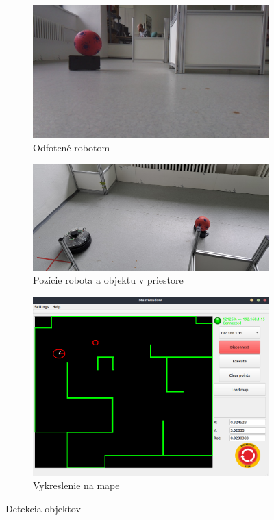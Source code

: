 \begin{figure}[!htbp]
	\centering

	\begin{subfigure}{0.49\textwidth}
		\includegraphics[width=\textwidth]{img/circles.jpg}
            \caption{ Odfotené robotom }
	\end{subfigure}
	\hfill
	\begin{subfigure}{0.49\textwidth}
		\includegraphics[width=\textwidth]{img/real.jpg}
            \caption{ Pozície robota a objektu v priestore }
	\end{subfigure}

	\vspace{\baselineskip}

	\begin{subfigure}{0.49\textwidth}
		\includegraphics[width=\textwidth]{img/mapa.png}
            \caption{ Vykreslenie na mape }
	\end{subfigure}

	\caption{ Detekcia objektov }
	\label{fig:progres-bars}
\end{figure}
